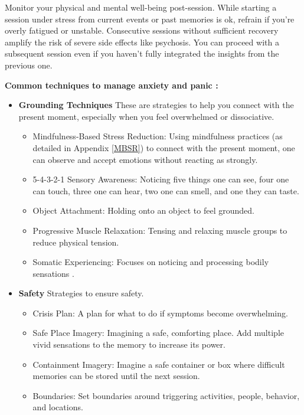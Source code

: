 \documentclass[12pt,letterpaper]{article}
\begin{document}
Monitor your physical and mental well-being post-session. While starting a session under stress from current events or past memories is ok, refrain if you're overly fatigued or unstable. Consecutive sessions without sufficient recovery amplify the risk of severe side effects like psychosis. You can proceed with a subsequent session even if you haven't fully integrated the insights from the previous one.

\vspace{\baselineskip}

\noindent \textbf{Common techniques to manage anxiety and panic \cite{vanderKolkBody,williamsWorkbook}:}
\begin{itemize}
    \item \textbf{Grounding Techniques} These are strategies to help you connect with the present moment, especially when you feel overwhelmed or dissociative.
    \begin{itemize}
        \item Mindfulness-Based Stress Reduction: Using mindfulness practices (as detailed in Appendix \ref{MBSR}) to connect with the present moment, one can observe and accept emotions without reacting as strongly.
        \item 5-4-3-2-1 Sensory Awareness: Noticing five things one can see, four one can touch, three one can hear, two one can smell, and one they can taste.
        \item Object Attachment: Holding onto an object to feel grounded.
        \item Progressive Muscle Relaxation: Tensing and relaxing muscle groups to reduce physical tension.
        \item Somatic Experiencing: Focuses on noticing and processing bodily sensations \cite{levineSomatic}.
    \end{itemize}
    \item \textbf{Safety} Strategies to ensure safety.
    \begin{itemize}
        \item Crisis Plan: A plan for what to do if symptoms become overwhelming.
        \item Safe Place Imagery: Imagining a safe, comforting place. Add multiple vivid sensations to the memory to increase its power.
        \item Containment Imagery: Imagine a safe container or box where difficult memories can be stored until the next session.
        \item Boundaries: Set boundaries around triggering activities, people, behavior, and locations.

\end{itemize}
\end{itemize}
\end{document}
